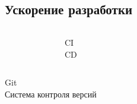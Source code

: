 \documentclass [8pt] {beamer}
\begin{document}
\subsection{Ускорение разработки}

\begin{frame}
\begin{columns}[T]
\begin{figure}[H]
\end{figure}
\vskip1.8cm
\centering
\huge
CI \\
CD
\end{columns}
\end{frame}

\begin{frame}
\begin{columns}[T]
\vskip1.7cm
\centering
\huge
Git \\
Система контроля версий
\begin{figure}[H]
\end{figure}
\end{columns}
\end{frame}
\end{document}
